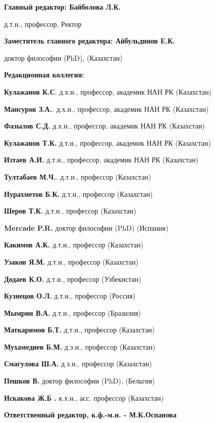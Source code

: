 \pagebreak
{\small
\begin{center}
\textbf{Главный редактор: Байболова Л.К.}

д.т.н., профессор, Ректор

\textbf{Заместитель главного редактора: Айбульдинов Е.К.}

доктор философии (РhD), (Казахстан)

\textbf{Редакционная коллегия:}
\end{center}

\textbf{Кулажанов К.С}. д.х.н., профессор, академик НАН РК (Казахстан)

\textbf{Мансуров З.А.}. д.х.н., профессор, академик НАН РК (Казахстан)

\textbf{Фазылов С.Д.} д.х.н., профессор, академик НАН РК (Казахстан)

\textbf{Кулажанов Т.К.} д.т.н., профессор, академик НАН РК (Казахстан)

\textbf{Изтаев А.И.} д.т.н., профессор, академик НАН РК (Казахстан)

\textbf{Тултабаев М.Ч.}. д.т.н., профессор (Казахстан)

\textbf{Нурахметов Б.К.} д.т.н., профессор (Казахстан)

\textbf{Шеров Т.К.} д.т.н., профессор (Казахстан)

\textbf{Mercade P.R.} доктор философии (PhD) (Испания)

\textbf{Какимов А.К.} д.т.н., профессор (Казахстан)

\textbf{Узаков Я.М.} д.т.н., профессор (Казахстан)

\textbf{Додаев К.О.} д.т.н., профессор (Узбекистан)

\textbf{Кузнецов О.Л.} д.т.н., профессор (Россия)

\textbf{Мымрин В.А.} д.т.н., профессор (Бразилия)

\textbf{Маткаримов Б.Т.} д.т.н., профессор (Казахстан)

\textbf{Мухамедиев Б.М.} д.э.н., профессор (Казахстан)

\textbf{Смагулова Ш.А.} д.э.н., профессор (Казахстан)

\textbf{Пешков В.} доктор философии (PhD), (Бельгия)

\textbf{Искакова Ж.Б .} к.х.н., асс. профессор (Казахстан)

\begin{center}
\textbf{Ответственный редактор, к.ф.-м.н. - М.К.Оспанова}
\end{center}

}
